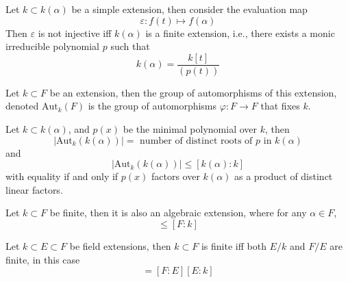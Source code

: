 \documentclass[openany]{book}
\begin{document}
\begin{prop}
    Let $k\subset k(\alpha)$ be a simple extension, then consider the evaluation map 
    \begin{equation*}
        \varepsilon: f(t)\mapsto f(\alpha)
    \end{equation*}
    Then $\varepsilon$ is not injective iff $k(\alpha)$ is a finite extension, i.e., there exists a monic irreducible polynomial $p$ such that 
    \begin{equation*}
        k(\alpha)=\frac{k[t]}{(p(t))}
    \end{equation*}
\end{prop}

\begin{defn}
    Let $k\subset F$ be an extension, then the group of automorphisms of this extension, denoted $\text{Aut}_k(F)$ is the group of automorphisms $\varphi:F\to F$ that fixes $k$.
\end{defn}

\begin{cor}
    Let $k\subset k(\alpha)$, and $p(x)$ be the minimal polynomial over $k$, then 
    \begin{equation*}
        |\text{Aut}_k(k(\alpha))|=\text{ number of distinct roots of $p$ in $k(\alpha)$}
    \end{equation*}
    and 
    \begin{equation*}
        |\text{Aut}_k(k(\alpha))|\leq [k(\alpha):k]
    \end{equation*}
    with equality if and only if $p(x)$ factors over $k(\alpha)$ as a product of distinct linear factors.
\end{cor}


\begin{prop}
    Let $k\subset F$ be finite, then it is also an algebraic extension, where for any $\alpha\in F$, 
    \begin{equation*}
        [k(\alpha):k]\leq [F: k]
    \end{equation*}
\end{prop}



\begin{prop}
    Let $k\subset E\subset F$ be field extensions, then $k\subset F$ is finite iff both $E/k$ and $F/E$ are finite, in this case 
    \begin{equation*}
        [F:k]=[F:E][E:k]
    \end{equation*}
\end{prop}
\end{document}
